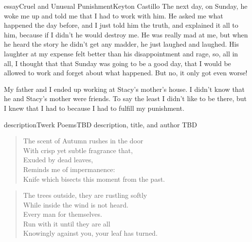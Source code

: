 \begin{prose}{essay}{Cruel and Unusual Punishment}{Keyton Castillo}
The next day, on Sunday, he woke me up and told me that I had to work with him. He asked me what happened the day before, and I just told him the truth, and explained it all to him, because if I didn't he would destroy me. He was really mad at me, but when he heard the story he didn't get any madder, he just laughed and laughed. His laughter at my expense felt better than his disappointment and rage, so, all in all, I thought that that Sunday was going to be a good day, that I would be allowed to work and forget about what happened. But no, it only got even worse!\par
My father and I ended up working at Stacy's mother's house. I didn't know that he and Stacy's mother were friends. To say the least I didn't like to be there, but I knew that I had to because I had to fulfill my punishment.
\end{prose}

% 


\begin{prose}{description}{Twerk Poems}{TBD}
    \LARGE description, title, and author TBD
\end{prose}

\clearpage
\setauthor{}

\begin{verse}
    The scent of Autumn rushes in the door\\
    With crisp yet subtle fragrance that,\\
    Exuded by dead leaves,\\
    Reminds me of impermanence:\\
    Knife which bisects this moment from the past.\\
\end{verse}

\vfill

\settowidth{\versewidth}{Knowingly against you, your leaf has turned.}
\hfill\begin{minipage}{\versewidth + \vleftmargin + 15pt}
\begin{verse}
    The trees outside, they are rustling softly\\ 
    While inside the wind is not heard.\\
    Every man for themselves.\\
    Run with it until they are all\\
    Knowingly against you, your leaf has turned.\\
\end{verse}
\end{minipage}

